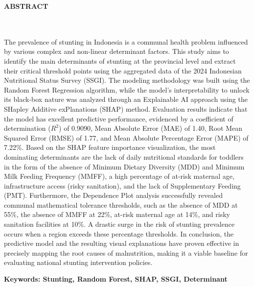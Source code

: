 \clearpage
{}%
\thispagestyle{fancy}

\begin{center}
    \large \bfseries \MakeUppercase{Abstract}\\
    \normalsize \normalfont {\thetitleEN}\\
    \normalsize \normalfont {\theauthor}\\
    \bigskip
    
    \normalsize \normalfont \justifying \singlespacing
    The prevalence of stunting in Indonesia is a communal health problem influenced by various complex and non-linear determinant factors. This study aims to identify the main determinants of stunting at the provincial level and extract their critical threshold points using the aggregated data of the 2024 Indonesian Nutritional Status Survey (SSGI). The modeling methodology was built using the Random Forest Regression algorithm, while the model's interpretability to unlock its black-box nature was analyzed through an Explainable AI approach using the SHapley Additive exPlanations (SHAP) method. Evaluation results indicate that the model has excellent predictive performance, evidenced by a coefficient of determination ($R^2$) of 0.9090, Mean Absolute Error (MAE) of 1.40, Root Mean Squared Error (RMSE) of 1.77, and Mean Absolute Percentage Error (MAPE) of 7.22\%. Based on the SHAP feature importance visualization, the most dominating determinants are the lack of daily nutritional standards for toddlers in the form of the absence of Minimum Dietary Diversity (MDD) and Minimum Milk Feeding Frequency (MMFF), a high percentage of at-risk maternal age, infrastructure access (risky sanitation), and the lack of Supplementary Feeding (PMT). Furthermore, the Dependence Plot analysis successfully revealed communal mathematical tolerance thresholds, such as the absence of MDD at 55\%, the absence of MMFF at 22\%, at-risk maternal age at 14\%, and risky sanitation facilities at 10\%. A drastic surge in the risk of stunting prevalence occurs when a region exceeds these percentage thresholds. In conclusion, the predictive model and the resulting visual explanations have proven effective in precisely mapping the root causes of malnutrition, making it a viable baseline for evaluating national stunting intervention policies.\par
    
    \vspace{20pt}
    \raggedright\textbf{Keywords: Stunting, Random Forest, SHAP, SSGI, Determinant}
    
    \vfill
    
\end{center}
\clearpage